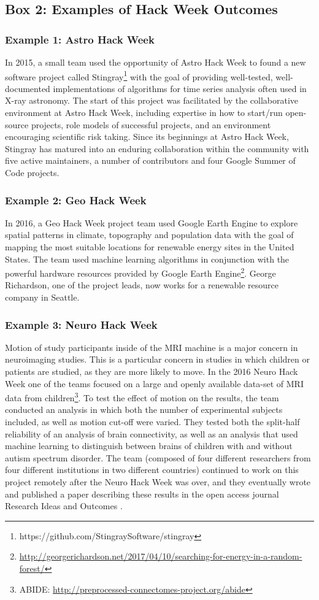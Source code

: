 \subsection*{Box 2: Examples of Hack Week Outcomes}
\label{box:outcomes}
\subsubsection*{Example 1: Astro Hack Week}
In 2015, a small team used the opportunity of Astro Hack Week to found a new software project called Stingray\footnote{https://github.com/StingraySoftware/stingray} with the goal of providing well-tested, well-documented implementations of algorithms for time series analysis often used in X-ray astronomy.
The start of this project was facilitated by the collaborative environment at Astro Hack Week, including expertise in how to start/run open-source projects, role models of successful projects, and an environment encouraging scientific risk taking.
Since its beginnings at Astro Hack Week, Stingray has matured into an enduring collaboration within the community with five active maintainers, a number of contributors and four Google Summer of Code projects.
\subsubsection*{Example 2: Geo Hack Week}
In 2016, a Geo Hack Week project team used Google Earth Engine to explore spatial patterns in climate, topography and population data with the goal of mapping the most suitable locations for renewable energy sites in the United States.
The team used machine learning algorithms in conjunction with the powerful hardware resources provided by Google Earth Engine\footnote{\url{http://georgerichardson.net/2017/04/10/searching-for-energy-in-a-random-forest/}}.
George Richardson, one of the project leads, now works for a renewable resource company in Seattle.
\subsubsection*{Example 3: Neuro Hack Week}
Motion of study participants inside of the MRI machine is a major concern in neuroimaging studies.
This is a particular concern in studies in which children or patients are studied, as they are more likely to move.
In the 2016 Neuro Hack Week one of the teams focused on a large and openly available data-set of MRI data from children\footnote{ABIDE: \url{http://preprocessed-connectomes-project.org/abide}}.
To test the effect of motion on the results, the team conducted an analysis in which both the number of experimental subjects included, as well as motion cut-off were varied.
They tested both the split-half reliability of an analysis of brain connectivity, as well as an analysis that used machine learning to distinguish between brains of children with and without autism spectrum disorder.
The team (composed of four different researchers from four different institutions in two different countries) continued to work on this project remotely after the Neuro Hack Week was over, and they eventually wrote and published a paper describing these results in the open access journal Research Ideas and Outcomes \cite{leonard2017}.
